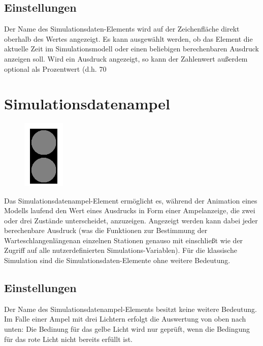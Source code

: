 \subsection*{Einstellungen}

Der Name des Simulationsdaten-Elements wird auf der Zeichenfläche direkt oberhalb des Wertes angezeigt.
Es kann ausgewählt werden, ob das Element die aktuelle Zeit im Simulationsmodell oder einen beliebigen
berechenbaren Ausdruck anzeigen soll. Wird ein Ausdruck angezeigt, so kann der Zahlenwert außerdem optional
als Prozentwert (d.h. 70%


\section{Simulationsdatenampel}
\label{ref:ModelElementAnimationTrafficLights}

\begin{figure}
\vspace{-22pt}
\includegraphics[width=2cm]{imageModelElementAnimationTrafficLights.png}
\vspace{-22pt}
\end{figure}

Das Simulationsdatenampel-Element ermöglicht es, während der Animation eines Modells laufend den Wert
eines Ausdrucks in Form einer Ampelanzeige, die zwei oder drei Zustände unterscheidet, anzuzeigen.
Angezeigt werden kann dabei jeder berechenbare Ausdruck (was die Funktionen zur Bestimmung der
Warteschlangenlängenan einzelnen Stationen genauso mit einschließt wie der Zugriff auf alle nutzerdefinierten
Simulations-Variablen). Für die klassische Simulation sind die Simulationsdaten-Elemente ohne weitere Bedeutung.

\subsection*{Einstellungen}

Der Name des Simulationsdatenampel-Elements besitzt keine weitere Bedeutung. Im Falle einer Ampel mit drei
Lichtern erfolgt die Auswertung von oben nach unten: Die Bedinung für das gelbe Licht wird nur geprüft,
wenn die Bedingung für das rote Licht nicht bereits erfüllt ist.


